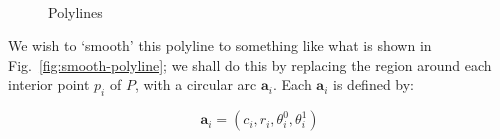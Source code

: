 \documentclass{article}
\begin{document}
\begin{figure}[h]
  \centering
  \hfill
  \\
  \caption{Polylines}
\end{figure}

We wish to `smooth' this polyline to something like what is shown in Fig.~\ref{fig:smooth-polyline}; we shall do this by replacing the region around each interior point $p_{i}$ of $P$, with a circular arc $\mathbf{a}_{i}$.  Each $\mathbf{a}_{i}$ is defined by:

\begin{equation}
  \label{eq:circ-def}
\mathbf{a}_i=\left(
  c_{i},
  r_{i},
  \theta^{0}_{i},
  \theta^{1}_{i}
\right)
\end{equation}
\end{document}
